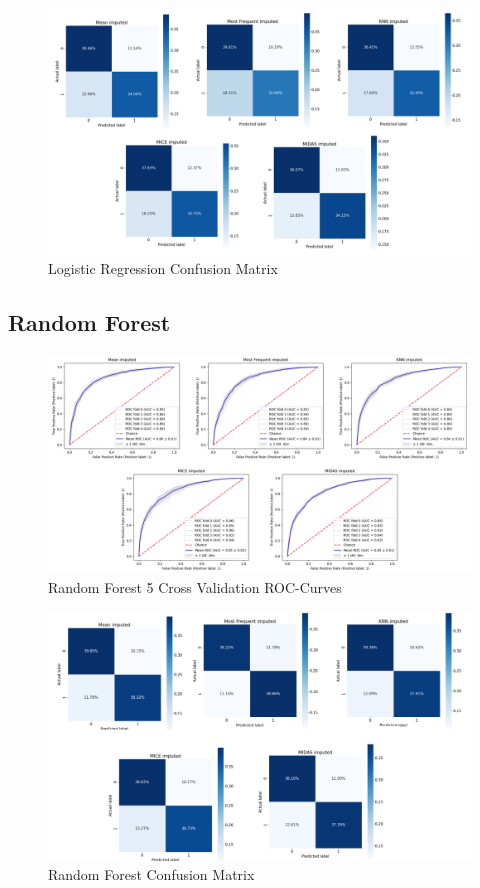 \documentclass{l4proj}
\begin{document}
\begin{appendices}
\begin{figure}[!h]
  \caption{Logistic Regression Confusion Matrix}
  \includegraphics[width=\textwidth]{dissertation/Latex/images/Classification Results/lg_cm.PNG}
\end{figure}
\pagebreak

\subsection{Random Forest}
\label{appendix:rfresults}
 \begin{figure}[!h]
  \caption{Random Forest 5 Cross Validation ROC-Curves}
  \includegraphics[width=\textwidth]{dissertation/Latex/images/Classification Results/rf_roc.PNG}
\end{figure}

\begin{figure}[!h]
  \caption{Random Forest Confusion Matrix}
  \includegraphics[width=\textwidth]{dissertation/Latex/images/Classification Results/rf_cm.PNG}
\end{figure}


\end{appendices}
\end{document}
